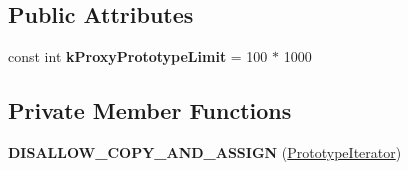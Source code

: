 \subsection*{Public Attributes}
\begin{DoxyCompactItemize}
\item 
const int {\bfseries k\+Proxy\+Prototype\+Limit} = 100 $\ast$ 1000\hypertarget{classv8_1_1internal_1_1_prototype_iterator_a31c493abd668b2639f1c774ab127eb9a}{}\label{classv8_1_1internal_1_1_prototype_iterator_a31c493abd668b2639f1c774ab127eb9a}

\end{DoxyCompactItemize}
\subsection*{Private Member Functions}
\begin{DoxyCompactItemize}
\item 
{\bfseries D\+I\+S\+A\+L\+L\+O\+W\+\_\+\+C\+O\+P\+Y\+\_\+\+A\+N\+D\+\_\+\+A\+S\+S\+I\+GN} (\hyperlink{classv8_1_1internal_1_1_prototype_iterator}{Prototype\+Iterator})\hypertarget{classv8_1_1internal_1_1_prototype_iterator_ae9db094ca719896ac6c324beaa78e5c7}{}\label{classv8_1_1internal_1_1_prototype_iterator_ae9db094ca719896ac6c324beaa78e5c7}

\end{DoxyCompactItemize}
